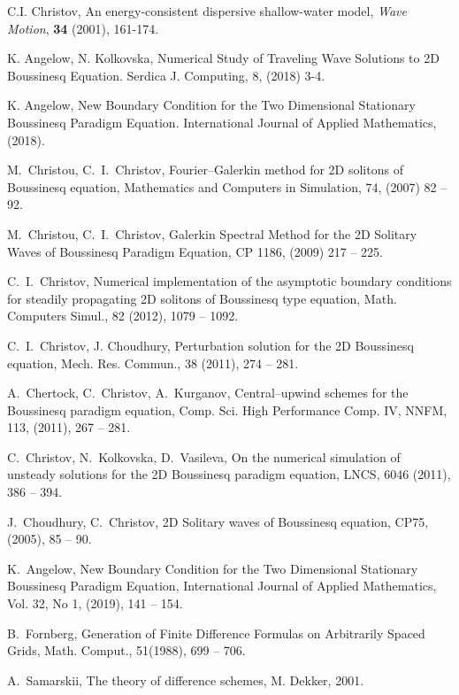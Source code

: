 \documentclass[leqno,11pt]{book}
\def\bibname{\rm R\,E\,F\,E\,R\,E\,N\,C\,E\,S} %
\begin{document}
\frenchspacing
\def\bibname{\rm R\,E\,F\,E\,R\,E\,N\,C\,E\,S}
\begin{thebibliography}{30}

 C.I. Christov, An energy-consistent dispersive shallow-water model,  {\it Wave Motion}, \textbf{34} (2001), 161-174.


K. Angelow, N. Kolkovska, Numerical Study of Traveling Wave Solutions to 2D Boussinesq Equation.
Serdica J. Computing,  8, (2018) 3-4.

K. Angelow, New Boundary Condition for the Two Dimensional Stationary Boussinesq Paradigm Equation.
International Journal of Applied Mathematics, (2018).


M.~Christou, C.~I.~Christov, Fourier–Galerkin method for 2D solitons of Boussinesq equation, 
Mathematics and Computers in Simulation, 74, (2007) 82 -- 92.

M.~Christou, C.~I.~Christov, Galerkin Spectral Method for the 2D Solitary
Waves of Boussinesq Paradigm Equation, CP 1186, (2009) 217 -- 225.

C.~I.~Christov,  Numerical implementation of the asymptotic boundary conditions
for steadily propagating 2D solitons of   Boussinesq type equation,       
Math. Computers  Simul., 82 (2012),  1079 -- 1092.

C.~I.~Christov, J. Choudhury, Perturbation solution  for the 2D Boussinesq equation,       
Mech. Res. Commun., 38 (2011),  274 -- 281.

A.~Chertock, C.~Christov, A.~Kurganov, Central--upwind schemes for the  Boussinesq paradigm equation, Comp. Sci. High Performance Comp. IV, NNFM, 113, (2011), 267 -- 281.

C.~Christov, N.~Kolkovska, D.~Vasileva, On the numerical simulation of unsteady solutions for the 2D Boussinesq paradigm equation, LNCS, 6046  (2011), 386 -- 394.

J.~Choudhury, C.~Christov, 2D  Solitary waves of  Boussinesq equation, CP75, (2005), 85 -- 90.
 
K.~Angelow, New Boundary Condition for the Two Dimensional Stationary Boussinesq Paradigm Equation, 
International Journal of Applied Mathematics, Vol. 32, No 1, (2019), 141 -- 154.

B.~Fornberg, Generation of Finite Difference Formulas on Arbitrarily Spaced Grids, 
Math. Comput., 51(1988),  699 -- 706.

A.~Samarskii, The theory of difference schemes, M. Dekker,  2001.

\end{thebibliography}
\end{document}

